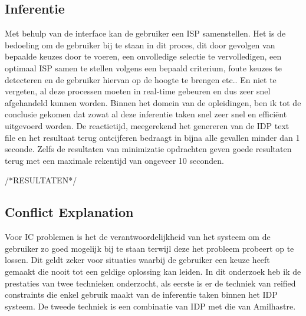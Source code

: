 \subsection{Inferentie} 
Met behulp van de interface kan de gebruiker een ISP samenstellen. Het is de bedoeling om de gebruiker bij te staan in dit proces, dit door gevolgen van bepaalde keuzes door te voeren, een onvolledige selectie te vervolledigen, een optimaal ISP samen te stellen volgens een bepaald criterium, foute keuzes te detecteren en de gebruiker hiervan op de hoogte te brengen etc.. En niet te vergeten, al deze processen moeten in real-time gebeuren en dus zeer snel afgehandeld kunnen worden. Binnen het domein van de opleidingen, ben ik tot de conclusie gekomen dat zowat al deze inferentie taken snel zeer snel en effici\"{e}nt uitgevoerd worden. De reactietijd, meegerekend het genereren van de IDP text file en het resultaat terug ontcijferen bedraagt in bijna alle gevallen minder dan 1 seconde. Zelfs de resultaten van minimizatie opdrachten geven goede resultaten terug met een maximale rekentijd van ongeveer 10 seconden. 

/*RESULTATEN*/

\subsection{Conflict Explanation} 
Voor IC problemen is het de verantwoordelijkheid van het systeem om de gebruiker zo goed mogelijk bij te staan terwijl deze het probleem probeert op te lossen. Dit geldt zeker voor situaties waarbij de gebruiker een keuze heeft gemaakt die nooit tot een geldige oplossing kan leiden. In dit onderzoek heb ik de prestaties van twee technieken onderzocht, als eerste is er de techniek van reified constraints die enkel gebruik maakt van de inferentie taken binnen het IDP systeem. De tweede techniek is een combinatie van IDP met die van Amilhastre.

